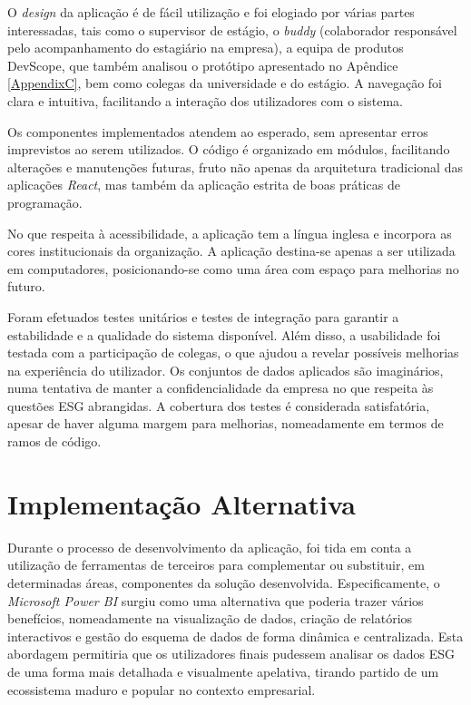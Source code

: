 O \textit{design} da aplicação é de fácil utilização e foi elogiado por várias partes interessadas, tais como o supervisor de estágio, o \textit{buddy} (colaborador responsável pelo acompanhamento do estagiário na empresa), a equipa de produtos DevScope, que também analisou o protótipo apresentado no Apêndice \ref{AppendixC}, bem como colegas da universidade e do estágio. A navegação foi clara e intuitiva, facilitando a interação dos utilizadores com o sistema.

Os componentes implementados atendem ao esperado, sem apresentar erros imprevistos ao serem utilizados. O código é organizado em módulos, facilitando alterações e manutenções futuras, fruto não apenas da arquitetura tradicional das aplicações \textit{React}, mas também da aplicação estrita de boas práticas de programação.

No que respeita à acessibilidade, a aplicação tem a língua inglesa e incorpora as cores institucionais da organização. A aplicação destina-se apenas a ser utilizada em computadores, posicionando-se como uma área com espaço para melhorias no futuro.

Foram efetuados testes unitários e testes de integração para garantir a estabilidade e a qualidade do sistema disponível. Além disso, a usabilidade foi testada com a participação de colegas, o que ajudou a revelar possíveis melhorias na experiência do utilizador. Os conjuntos de dados aplicados são imaginários, numa tentativa de manter a confidencialidade da empresa no que respeita às questões ESG abrangidas. A cobertura dos testes é considerada satisfatória, apesar de haver alguma margem para melhorias, nomeadamente em termos de ramos de código.

\section{Implementação Alternativa} 

Durante o processo de desenvolvimento da aplicação, foi tida em conta a utilização de ferramentas de terceiros para complementar ou substituir, em determinadas áreas, componentes da solução desenvolvida. Especificamente, o \textit{Microsoft Power BI} surgiu como uma alternativa que poderia trazer vários benefícios, nomeadamente na visualização de dados, criação de relatórios interactivos e gestão do esquema de dados de forma dinâmica e centralizada. Esta abordagem permitiria que os utilizadores finais pudessem analisar os dados ESG de uma forma mais detalhada e visualmente apelativa, tirando partido de um ecossistema maduro e popular no contexto empresarial.

